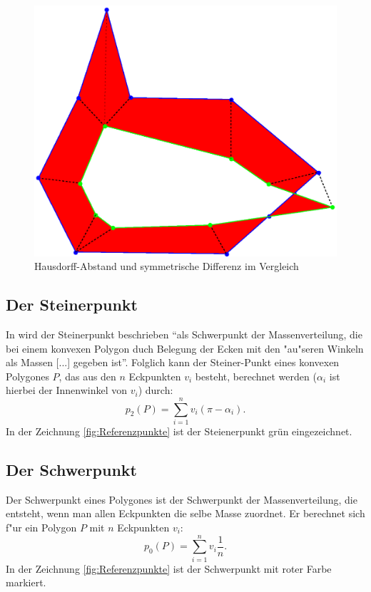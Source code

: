 \begin{figure}
	\centering
	\includegraphics[scale=.6]{Metrikengestoert.eps}
	\caption{Hausdorff-Abstand und symmetrische Differenz im Vergleich}
	\label{fig:VergleichMetrik}
\end{figure}


\subsection{Der Steinerpunkt}\label{Steinerpunkt}

In \cite{Sch} wird der Steinerpunkt beschrieben "`als Schwerpunkt der Massenverteilung, die bei einem konvexen Polygon duch Belegung der Ecken mit den "au"seren Winkeln als Massen [...] gegeben ist"'. Folglich kann der Steiner-Punkt eines konvexen Polygones $P$, das aus den $n$ Eckpunkten $v_i$ besteht, berechnet werden ($\alpha_i$ ist hierbei der Innenwinkel von $v_i$) durch:
\[p_2(P)=\sum^n_{i=1}v_i (\pi-\alpha_i).\]
In der Zeichnung \ref{fig:Referenzpunkte} ist der Steienerpunkt grün eingezeichnet.


\subsection{Der Schwerpunkt}\label{Schwerp}

Der Schwerpunkt eines Polygones ist der Schwerpunkt der Massenverteilung, die entsteht, wenn man allen Eckpunkten die selbe Masse zuordnet. Er berechnet sich f"ur ein Polygon $P$ mit $n$ Eckpunkten $v_i$:
\[p_0(P)=\sum^n_{i=1}v_i \frac{1}{n}.\]
In der Zeichnung \ref{fig:Referenzpunkte} ist der Schwerpunkt mit roter Farbe markiert. 

